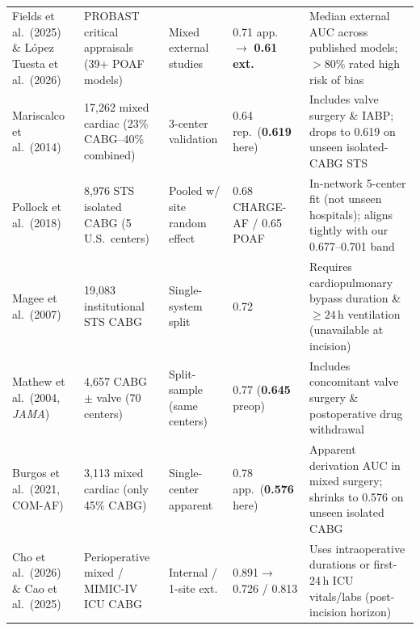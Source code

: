 \begin{table}[t]
\centering\tablefont
\caption{}
\label{tab:lit_reconciliation}
\setlength{\tabcolsep}{3.6pt}
\renewcommand{\arraystretch}{1.04}
\begin{tabularx}{\textwidth}{@{}L{3.25cm}L{3.25cm}L{2.25cm}L{2.35cm}Y@{}}
\toprule
{} &  &  &  &  \\
\midrule
Fields et al.\ (2025)\cite{fields2025poaf} \& L\'opez Tuesta et al.\ (2026)\cite{lopeztuesta2026poaf} & PROBAST critical appraisals (39+ POAF models) & Mixed external studies & 0.71 app.\ $\to$ \textbf{0.61 ext.} & Median external AUC across published models; $>$80\% rated high risk of bias \\
Mariscalco et al.\ (2014)\cite{mariscalco2014poaf} & 17,262 mixed cardiac (23\% CABG--40\% combined) & 3-center validation & 0.64 rep.\ (\textbf{0.619} here) & Includes valve surgery \& IABP; drops to 0.619 on unseen isolated-CABG STS \\
Pollock et al.\ (2018)\cite{pollock2018chargeaf} & 8,976 STS isolated CABG (5 U.S.\ centers) & Pooled w/ site random effect & 0.68 CHARGE-AF / 0.65 POAF & In-network 5-center fit (not unseen hospitals); aligns tightly with our 0.677--0.701 band \\
Magee et al.\ (2007)\cite{magee2007atrial} & 19,083 institutional STS CABG & Single-system split & 0.72 & Requires cardiopulmonary bypass duration \& $\ge 24$\,h ventilation (unavailable at incision) \\
Mathew et al.\ (2004, \textit{JAMA})\cite{mathew2004multicenter} & 4,657 CABG $\pm$ valve (70 centers) & Split-sample (same centers) & 0.77 (\textbf{0.645} preop) & Includes concomitant valve surgery \& postoperative drug withdrawal \\
Burgos et al.\ (2021, COM-AF)\cite{burgos2021comaf} & 3,113 mixed cardiac (only 45\% CABG) & Single-center apparent & 0.78 app.\ (\textbf{0.576} here) & Apparent derivation AUC in mixed surgery; shrinks to 0.576 on unseen isolated CABG \\
Cho et al.\ (2026)\cite{cho2026poaf} \& Cao et al.\ (2025)\cite{cao2025mimic4} & Perioperative mixed / MIMIC-IV ICU CABG & Internal / 1-site ext. & 0.891$\to$0.726 / 0.813 & Uses intraoperative durations or first-24\,h ICU vitals/labs (post-incision horizon) \\

\end{tabularx}
\end{table}
